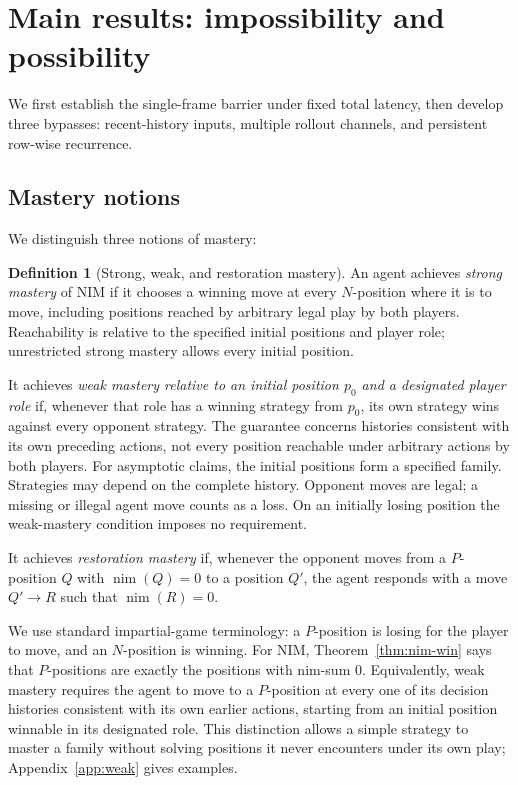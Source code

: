 \documentclass[11pt]{article}
\theoremstyle{plain}
\theoremstyle{definition}
\newtheorem{definition}[theorem]{Definition}
\theoremstyle{remark}
\numberwithin{equation}{section}
\begin{document}
\section{Main results: impossibility and possibility}
\label{sec:main}

We first establish the single-frame barrier under fixed total latency, then develop three bypasses: recent-history inputs, multiple rollout channels, and persistent row-wise recurrence.

\subsection{Mastery notions}
We distinguish three notions of mastery:

\begin{definition}[Strong, weak, and restoration mastery]
\label{def:mastery}
An agent achieves \emph{strong mastery} of NIM if it chooses a winning move at every $N$-position where it is to move, including positions reached by arbitrary legal play by both players. Reachability is relative to the specified initial positions and player role; unrestricted strong mastery allows every initial position.

It achieves \emph{weak mastery relative to an initial position $p_0$ and a designated player role} if, whenever that role has a winning strategy from $p_0$, its own strategy wins against every opponent strategy. The guarantee concerns histories consistent with its own preceding actions, not every position reachable under arbitrary actions by both players. For asymptotic claims, the initial positions form a specified family. Strategies may depend on the complete history. Opponent moves are legal; a missing or illegal agent move counts as a loss. On an initially losing position the weak-mastery condition imposes no requirement.

It achieves \emph{restoration mastery} if, whenever the opponent moves from a $P$-position $Q$ with $\operatorname{nim}(Q)=0$ to a position $Q'$, the agent responds with a move $Q'\to R$ such that $\operatorname{nim}(R)=0$.
\end{definition}

We use standard impartial-game terminology: a $P$-position is losing for the player to move, and an $N$-position is winning.
For NIM, Theorem~\ref{thm:nim-win} says that $P$-positions are exactly the positions with nim-sum $0$. Equivalently, weak mastery requires the agent to move to a $P$-position at every one of its decision histories consistent with its own earlier actions, starting from an initial position winnable in its designated role. This distinction allows a simple strategy to master a family without solving positions it never encounters under its own play; Appendix~\ref{app:weak} gives examples.
\end{document}
